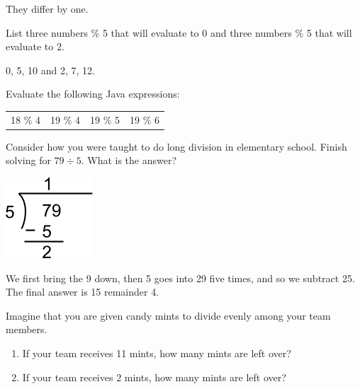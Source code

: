 \begin{answer}
They differ by one.
\end{answer}


\Q List three numbers \% 5 that will evaluate to 0 and three numbers \% 5 that will evaluate to 2.

\begin{answer}
0, 5, 10 and 2, 7, 12.
\end{answer}


\Q Evaluate the following Java expressions:

\begin{center}
\begin{tabular}{C{1in}C{1in}C{1in}C{1in}}
18 \% 4  &
19 \% 4  &
19 \% 5  &
19 \% 6  \\
\end{tabular}
\end{center}


\newpage

\Q Consider how you were taught to do long division in elementary school.
Finish solving for $79 \div 5$.
What is the answer?

\begin{center}
\includegraphics[scale=0.65]{div79by5.png}
\end{center}

\begin{answer}[3em]
We first bring the 9 down, then 5 goes into 29 five times, and so we subtract 25. The final answer is 15 remainder 4.
\end{answer}


\Q \label{mints}
Imagine that you are given candy mints to divide evenly among your team members.

\begin{enumerate}
\item If your team receives 11 mints, how many mints are left over?


\item If your team receives 2 mints, how many mints are left over?

\end{enumerate}


